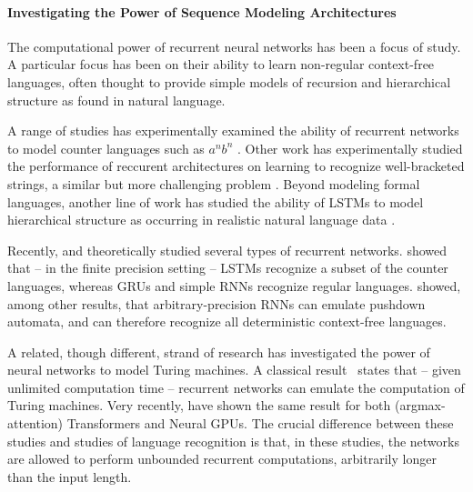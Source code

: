 \documentclass[11pt,a4paper]{article}
\begin{document}
\paragraph{Investigating the Power of Sequence Modeling Architectures}
The computational power of recurrent neural networks has been a focus of study.
A particular focus has been on their ability to learn non-regular context-free languages, often thought to provide simple models of recursion and hierarchical structure as found in natural language.

A range of studies has experimentally examined the ability of recurrent networks to model counter languages such as $a^nb^n$ \cite{kalinke1998computation,gers2001lstm,cartling2008implicit,weiss2018practical,suzgun2019evaluating}.
Other work has experimentally studied the performance of reccurent architectures on learning to recognize well-bracketed strings, a similar but more challenging problem \cite{sennhauser2018evaluating,skachkova2018closing,bernardy2018can}.
Beyond modeling formal languages, another line of work has studied the ability of LSTMs to model hierarchical structure as occurring in realistic natural language data \cite{linzen2016assessing,gulordava2018colorless}.

Recently, \citet{merrill2019sequential} and \citet{korsky2019computational} theoretically studied several types of recurrent networks. \citet{merrill2019sequential} showed that -- in the finite precision setting -- LSTMs recognize a subset of the counter languages, whereas GRUs and simple RNNs recognize regular languages.
\citet{korsky2019computational} showed, among other results, that arbitrary-precision RNNs can emulate pushdown automata, and can therefore recognize all deterministic context-free languages.


A related, though different, strand of research has investigated the power of neural networks to model Turing machines.
A classical result~\cite{siegelman1991neural} states that -- given unlimited computation time -- recurrent networks can emulate the computation of Turing machines.
Very recently, \citet{perez2019turing} have shown the same result for both (argmax-attention) Transformers and Neural GPUs.
The crucial difference between these studies and studies of language recognition is that, in these studies, the networks are allowed to perform unbounded recurrent computations, arbitrarily longer than the input length.
\end{document}
